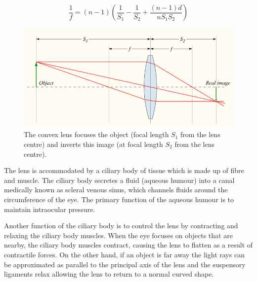 \begin{equation}
 \frac{1}{f} = (n-1) \left( \frac{1}{S_1} - \frac{1}{S_2} + \frac{(n-1)d}{n S_1 S_2} \right)
\label{eq:lens_makers}
\end{equation}

\begin{figure}[H]
\centering
  \includegraphics{figures/convergent_lens2}
\caption{The convex lens focuses the object (focal length $S_1$ from the lens centre)
         and inverts this image (at focal length $S_2$ from the lens centre).
         \cite{greivenkamp2004field}}
\label{fig:convergent_lens}
\end{figure}

The lens is accommodated by a ciliary body of tissue which is made up of fibre and
muscle. The ciliary body secretes a fluid (aqueous humour) into a canal medically
known as scleral venous sinus, which channels fluids around the circumference of
the eye.\cite{bill1970effects,dvorak1934schlemm} The primary function of the
aqueous humour is to maintain intraocular pressure.

Another function of the ciliary body is to control the lens by contracting and relaxing the
ciliary body muscles. When the eye focuses on objects that are nearby, the ciliary body
muscles contract, causing the lens to flatten as a result of contractile forces. On the
other hand, if an  object is far away the light rays can be approximated as parallel to the
principal axis of the lens and the suspensory ligaments relax allowing the lens to return
to a normal curved shape.

